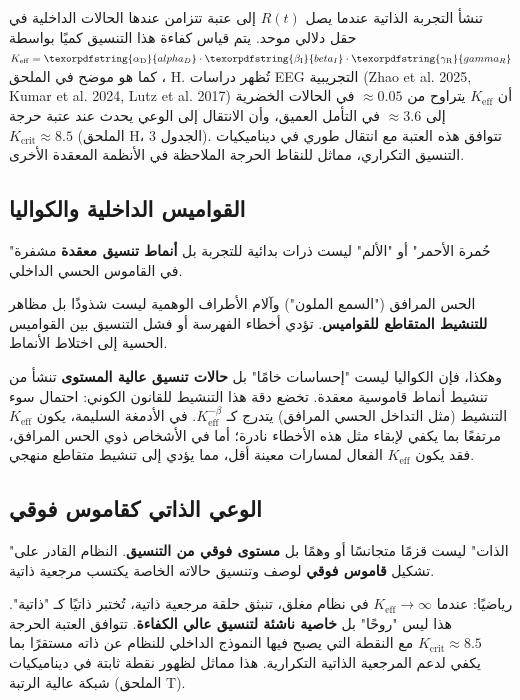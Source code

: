 \documentclass[12pt,a4paper]{article}
\DeclareRobustCommand{\alD}{\texorpdfstring{\ensuremath{\alpha_{\mathrm{D}}}}{alpha_D}}
\DeclareRobustCommand{\beI}{\texorpdfstring{\ensuremath{\beta_{\mathrm{I}}}}{beta_I}}
\DeclareRobustCommand{\gaR}{\texorpdfstring{\ensuremath{\gamma_{\mathrm{R}}}}{gamma_R}}
\newcommand{\eff}{\mathrm{eff}}
\newcommand{\Ke}{K_{\eff}}
\newcommand{\Kcrit}{K_{\mathrm{crit}}}
\begin{document}
	تنشأ التجربة الذاتية عندما يصل $R(t)$ إلى عتبة تتزامن عندها الحالات الداخلية في حقل دلالي موحد. يتم قياس كفاءة هذا التنسيق كميًا بواسطة \(\Ke = \alD \cdot \beI \cdot \gaR\)، كما هو موضح في الملحق H. تُظهر دراسات EEG التجريبية (Zhao et al. 2025, Kumar et al. 2024, Lutz et al. 2017) أن \(\Ke\) يتراوح من \(\approx 0.05\) في الحالات الخضرية إلى \(\approx 3.6\) في التأمل العميق، وأن الانتقال إلى الوعي يحدث عند عتبة حرجة \(\Kcrit \approx 8.5\) (الملحق H، الجدول 3). تتوافق هذه العتبة مع انتقال طوري في ديناميكيات التنسيق التكراري، مماثل للنقاط الحرجة الملاحظة في الأنظمة المعقدة الأخرى.
	
	\subsection{القواميس الداخلية والكواليا}
	
	"حُمرة الأحمر" أو "الألم" ليست ذرات بدائية للتجربة بل \textbf{أنماط تنسيق معقدة} مشفرة في القاموس الحسي الداخلي.
	
	\begin{tcolorbox}[title=مثال: الحس المرافق وآلام الأطراف الوهمية]
		الحس المرافق ("السمع الملون") وآلام الأطراف الوهمية ليست شذوذًا بل مظاهر \textbf{للتنشيط المتقاطع للقواميس}. تؤدي أخطاء الفهرسة أو فشل التنسيق بين القواميس الحسية إلى اختلاط الأنماط.
	\end{tcolorbox}
	
	وهكذا، فإن الكواليا ليست "إحساسات خامًا" بل \textbf{حالات تنسيق عالية المستوى} تنشأ من تنشيط أنماط قاموسية معقدة. تخضع دقة هذا التنشيط للقانون الكوني: احتمال سوء التنشيط (مثل التداخل الحسي المرافق) يتدرج كـ \(\Ke^{-\beta}\). في الأدمغة السليمة، يكون \(\Ke\) مرتفعًا بما يكفي لإبقاء مثل هذه الأخطاء نادرة؛ أما في الأشخاص ذوي الحس المرافق، فقد يكون \(\Ke\) الفعال لمسارات معينة أقل، مما يؤدي إلى تنشيط متقاطع منهجي.
	
	\subsection{الوعي الذاتي كقاموس فوقي}
	
	"الذات" ليست قزمًا متجانسًا أو وهمًا بل \textbf{مستوى فوقي من التنسيق}. النظام القادر على تشكيل \textbf{قاموس فوقي} لوصف وتنسيق حالاته الخاصة يكتسب مرجعية ذاتية.
	
	رياضيًا: عندما \(\Ke \to \infty\) في نظام مغلق، تنبثق حلقة مرجعية ذاتية، تُختبر ذاتيًا كـ "ذاتية". هذا ليس "روحًا" بل \textbf{خاصية ناشئة لتنسيق عالي الكفاءة}. تتوافق العتبة الحرجة \(\Kcrit \approx 8.5\) مع النقطة التي يصبح فيها النموذج الداخلي للنظام عن ذاته مستقرًا بما يكفي لدعم المرجعية الذاتية التكرارية. هذا مماثل لظهور نقطة ثابتة في ديناميكيات شبكة عالية الرتبة (الملحق T).
	
\end{document}
